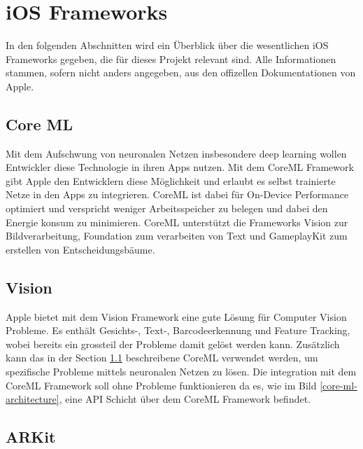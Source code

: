 \section{iOS Frameworks}
In den folgenden Abschnitten wird ein Überblick über die wesentlichen iOS Frameworks gegeben, die für dieses Projekt relevant sind. Alle Informationen stammen, sofern nicht anders angegeben, aus den offizellen Dokumentationen von Apple. %


\subsection{Core ML} \label{subsub:core-ml}
Mit dem Aufschwung von neuronalen Netzen insbesondere deep learning wollen Entwickler diese Technologie in ihren Apps nutzen. Mit dem CoreML Framework gibt Apple den Entwicklern diese Möglichkeit und erlaubt es selbst trainierte Netze in den Apps zu integrieren. CoreML \cite{core-ml} ist dabei für On-Device Performance optimiert und verspricht weniger Arbeitsspeicher zu belegen und dabei den Energie konsum zu minimieren. CoreML unterstützt die Frameworks Vision zur Bildverarbeitung, Foundation zum verarbeiten von Text und GameplayKit zum erstellen von Entscheidungsbäume.


\subsection{Vision}
Apple bietet mit dem Vision \cite{vision} Framework eine gute Lösung für Computer Vision Probleme. Es enthält Gesichts-, Text-, Barcodeerkennung und Feature Tracking, wobei bereits ein grossteil der Probleme damit gelöst werden kann. Zusätzlich kann das in der Section \ref{subsub:core-ml} beschreibene CoreML verwendet werden, um spezifische Probleme mittels neuronalen Netzen zu lösen. Die integration mit dem CoreML Framework soll ohne Probleme funktionieren da es, wie im Bild \ref{core-ml-architecture}, eine API Schicht über dem CoreML Framework befindet.

\subsection{ARKit}

